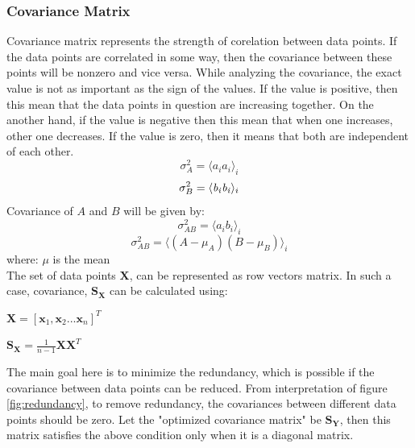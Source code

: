\subsubsection{Covariance Matrix}
Covariance matrix represents the strength of corelation between data points. If the data points are correlated in some way, then the covariance between these points will be nonzero and vice versa. While analyzing the covariance, the exact value is not as important as the sign of the values. If the value is positive, then this mean that the data points in question are increasing together. On the another hand, if the value is negative then this mean that when one increases, other one decreases. If the value is zero, then it means that both are independent of each other.\\
\begin{equation}
\sigma^2_A = \langle \mathit{a_ia_i} \rangle_i
\end{equation}
\begin{equation}
\sigma^2_B = \langle \mathit{b_ib_i} \rangle_i\\
\end{equation}
Covariance of $\mathit{A}$ and $\mathit{B}$ will be given by:
\begin{equation}
\sigma^2_{AB} = \langle \mathit{a_ib_i} \rangle_i
\end{equation}
\begin{equation}
\sigma^2_{AB} = \langle \mathit{(A-\mu_A)(B-\mu_B)} \rangle_i
\end{equation}
where: $\mu$ is the mean\\
The set of data points $\textbf{X}$, can be represented as row vectors matrix. In such a case, covariance, $\mathbf{S_X}$ can be calculated using:
\begin{center}
	$\mathbf{X} = [\mathbf{x}_1,\mathbf{x}_2 ... \mathbf{x}_n]^T$\\
\end{center}
\begin{center}
	$\mathbf{S_X} = \frac{1}{n-1}\mathbf{XX}^T$
\end{center}	
The main goal here is to minimize the redundancy, which is possible if the covariance between data points can be reduced. From interpretation of figure \ref{fig:redundancy}, to remove redundancy, the covariances between different data points should be zero. Let the "optimized covariance matrix" be $\mathbf{S_Y}$, then this matrix satisfies the above condition only when it is a diagonal matrix. 
